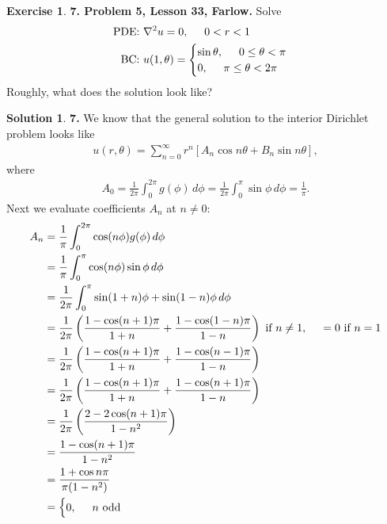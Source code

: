 \documentclass{book}
\theoremstyle{definition}
\newtheorem*{exer*}{Exercise}
\newtheorem*{sln*}{Solution}
\newcommand{\f}[2]{\frac{#1}{#2}}
\newcommand{\lp}{\left(}
\newcommand{\rp}{\right)}
\newcommand{\lb}{\left[}
\newcommand{\rb}{\right]}
\begin{document}
\begin{exer*}\textbf{7. Problem 5, Lesson 33, Farlow.} Solve 
	\begin{align*}
	\text{PDE: } & \laplacian u = 0, \hspace{0.5cm} 0 < r < 1\\
	\text{BC: } & u(1,\theta) = \begin{cases}
	\sin\theta, \hspace{0.5cm} 0 \leq \theta < \pi\\
	0, \hspace{0.5cm} \pi \leq \theta < 2\pi
	\end{cases}
	\end{align*}
	Roughly, what does the solution look like? 
	
	\begin{sln*}\textbf{7.} We know that the general solution to the interior Dirichlet problem looks like
		\begin{align*}
		u(r,\theta) = \sum^\infty_{n=0}r^n \lb A_n\cos n\theta + B_n \sin n\theta\rb,
		\end{align*}
		where
		\begin{align*}
		A_0 = \f{1}{2\pi}\int^{2\pi}_0 g(\phi)\,d\phi = \f{1}{2\pi}\int^{\pi}_0 \sin\phi\,d\phi = \f{1}{\pi}.
		\end{align*}
		Next we evaluate coefficients $A_n$ at $n\neq 0$:
		\begin{align*}
		A_n &= \f{1}{\pi}\int^{2\pi}_0 \cos(n\phi)g(\phi)\,d\phi \\
		&= \f{1}{\pi}\int^{\pi}_0 \cos(n\phi)\sin\phi\,d\phi \\
		&= \f{1}{2\pi}\int^{\pi}_0 \sin(1+n)\phi + \sin(1-n)\phi\,d\phi\\
		&= \frac{1}{2\pi}\lp\f{1 - \cos(n+1)\pi}{1+n} + \f{1 - \cos(1-n)\pi}{1-n}\rp \text{ if }n\neq 1, \hspace{0.5cm} = 0 \text{ if } n = 1\\
		&= \frac{1}{2\pi}\lp\f{1 - \cos(n+1)\pi}{1+n} + \f{1 - \cos(n-1)\pi}{1-n}\rp\\
		&= \frac{1}{2\pi}\lp\f{1 - \cos(n+1)\pi}{1+n} + \f{1 - \cos(n+1)\pi}{1-n}\rp\\
		&= \f{1}{2\pi}\lp\f{2 - 2\cos(n+1)\pi}{1-n^2}\rp\\
		&= \f{1 - \cos(n+1)\pi}{1 - n^2}\\
		&= \f{1 + \cos n\pi}{\pi(1-n^2)}\\
		&= \begin{cases}
		0, \hspace{0.5cm} n \text{ odd}\\

\end{cases}
\end{align*}
\end{sln*}
\end{exer*}
\end{document}
